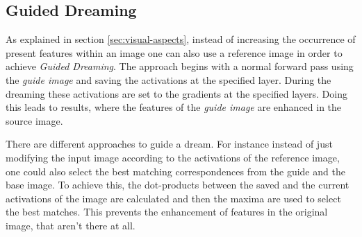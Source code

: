 \subsection{Guided Dreaming}
\label{guided-dreaming}
As explained in section \ref{sec:visual-aspects}, instead of increasing the occurrence of present features within an image one can also use a reference image in order to achieve \emph{Guided Dreaming}.
The approach begins with a normal forward pass using the \emph{guide image} and saving the activations at the specified layer.
During the dreaming these activations are set to the gradients at the specified layers.
Doing this leads to results, where the features of the \emph{guide image} are enhanced in the source image.


There are different approaches to guide a dream.
For instance instead of just modifying the input image according to the activations of the reference image, one could also select the best matching correspondences from the guide and the base image.
To achieve this, the dot-products between the saved and the current activations of the image are calculated and then the maxima are used to select the best matches.
This prevents the enhancement of  features in the original image, that aren't there at all.\cite{deep-dream-github}


